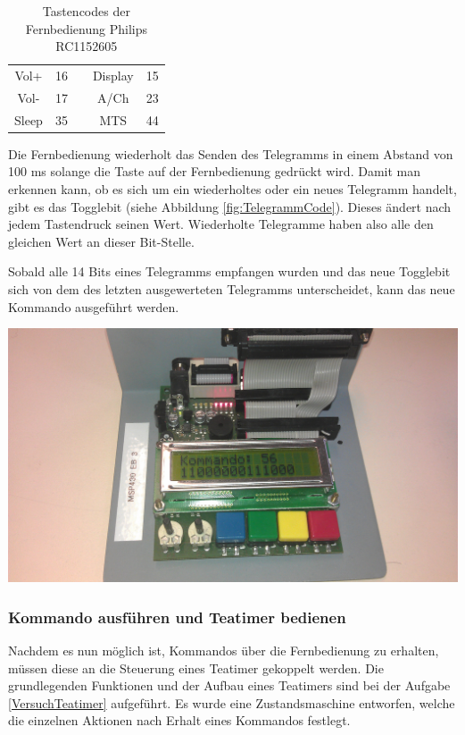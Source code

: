 \documentclass[12pt,a4paper,bibliography=totocnumbered,listof=totocnumbered]{scrartcl}
\begin{document}
\begin{table}[h]
\begin{tabular}{|c|c|c|c|c|}
		\cellcolor[gray]{.8}Vol+                     & 16                  &                       & \cellcolor[gray]{.8}Display       & 15                  \\ \cline{1-2} \cline{4-5}
		\cellcolor[gray]{.8}Vol-                     & 17                  &                       & \cellcolor[gray]{.8}A/Ch	       & 23                  \\ \cline{1-2} \cline{4-5}  
		\cellcolor[gray]{.8}Sleep                    & 35                  & \multicolumn{1}{l|}{} & \cellcolor[gray]{.8}MTS           & 44                  \\ \cline{1-2} \cline{4-5} 
	\end{tabular}
	\caption{Tastencodes der Fernbedienung Philips RC1152605}
	\label{TastencodeTabelle}
\end{table}

Die Fernbedienung wiederholt das Senden des Telegramms in einem Abstand von 100 ms solange die Taste auf der Fernbedienung gedrückt wird. Damit man erkennen kann, ob es sich um ein wiederholtes oder ein neues Telegramm handelt, gibt es das Togglebit (siehe Abbildung \ref{fig:TelegrammCode}). Dieses ändert nach jedem Tastendruck seinen Wert. Wiederholte Telegramme haben also alle den gleichen Wert an dieser Bit-Stelle.

Sobald alle 14 Bits eines Telegramms empfangen wurden und das neue Togglebit sich von dem des letzten ausgewerteten Telegramms unterscheidet, kann das neue Kommando ausgeführt werden.

\vspace{1em}
\begin{minipage}{\linewidth}
	\centering
	\includegraphics[width=0.7\linewidth]{img/Fernbedienung2.jpg}
	\label{fig:Kommando}
\end{minipage}

\subsubsection{Kommando ausführen und Teatimer bedienen}
Nachdem es nun möglich ist, Kommandos über die Fernbedienung zu erhalten, müssen diese an die Steuerung eines Teatimer gekoppelt werden. Die grundlegenden Funktionen und der Aufbau eines Teatimers sind bei der Aufgabe \ref{VersuchTeatimer} aufgeführt.\newline
Es wurde eine Zustandsmaschine entworfen, welche die einzelnen Aktionen nach Erhalt eines Kommandos festlegt.
\end{document}
